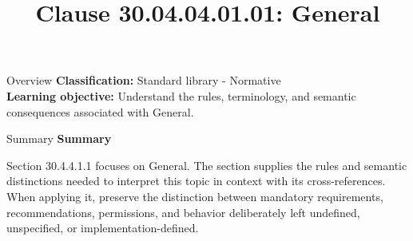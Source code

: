 \documentclass[10pt,letterpaper]{article}
\title{Clause 30.04.04.01.01: General}
\author{}
\date{}
\begin{document}
\maketitle
\begin{CornellOverviewBox}{Overview}
\textbf{Classification:} Standard library - Normative\\[2pt]
\textbf{Learning objective:} Understand the rules, terminology, and semantic consequences associated with General.
\end{CornellOverviewBox}\begin{CornellSummaryBox}{Summary}
{\sffamily\bfseries\color{Accent} Summary}\par\vspace{3pt}Section 30.4.4.1.1 focuses on General. The section supplies the rules and semantic distinctions needed to interpret this topic in context with its cross-references. When applying it, preserve the distinction between mandatory requirements, recommendations, permissions, and behavior deliberately left undefined, unspecified, or implementation-defined.
\end{CornellSummaryBox}
\end{document}
